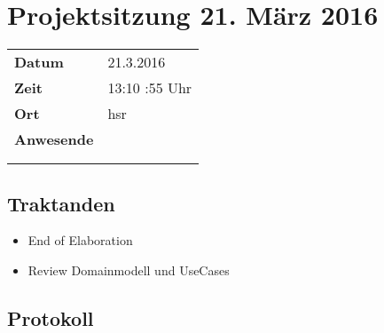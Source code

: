 \documentclass[class=scrbook,crop=false]{standalone}
\begin{document}
	
	\section*{Projektsitzung 21. März 2016}
	
	\begin{tabular}{ll}
		\textbf{Datum} & 21.3.2016 \\
		\textbf{Zeit} & 13:10 \textendash 13:55 Uhr \\
		\textbf{Ort} & \acs{hsr} \\
		\textbf{Anwesende} & \proff \\ & \ubos \\ & \pchr
	\end{tabular}
	
	\subsection*{Traktanden}
	
	\begin{itemize}
		\item End of Elaboration
        \item Review Domainmodell und UseCases
	\end{itemize}
	
	\subsection*{Protokoll}
\end{document}
